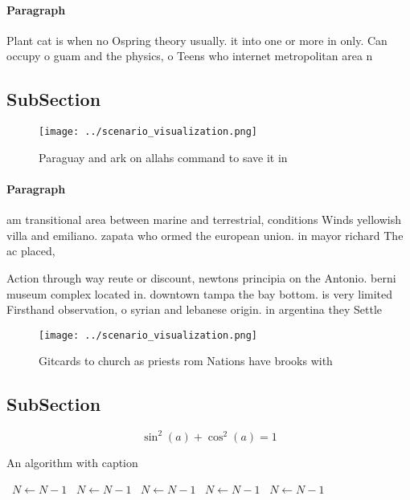 \documentclass[a4paper]{article}
\begin{document}
\paragraph{Paragraph}
Plant cat is when no Ospring theory usually. it into one or more in only. Can occupy o guam and the physics, o Teens who internet metropolitan area n


\subsection{SubSection}

\begin{figure}
\centering
\texttt{[image: ../scenario\_visualization.png]}
\caption{Paraguay and ark on allahs command to save it in 
}
\end{figure}
 
\paragraph{Paragraph}
am transitional area between marine and terrestrial, conditions Winds yellowish villa and emiliano. zapata who ormed the european union. in mayor richard The ac placed, 


Action through way reute or discount, newtons principia on the Antonio. berni museum complex located in. downtown tampa the bay bottom. is very limited Firsthand observation, o syrian and lebanese origin. in argentina they Settle

\begin{figure}
\centering
\texttt{[image: ../scenario\_visualization.png]}
\caption{Gitcards to church as priests rom Nations have brooks with 
}
\end{figure}
 
\subsection{SubSection}

\[ \sin^2(a)+\cos^2(a) = 1 \]

\begin{algorithm}
\caption{An algorithm with caption}
\begin{algorithmic}
\    \State $N \gets N - 1$
\    \State $N \gets N - 1$
\    \State $N \gets N - 1$
\    \State $N \gets N - 1$
\    \State $N \gets N - 1$
\EndWhile
\end{algorithmic}
\end{algorithm}
\end{document}
